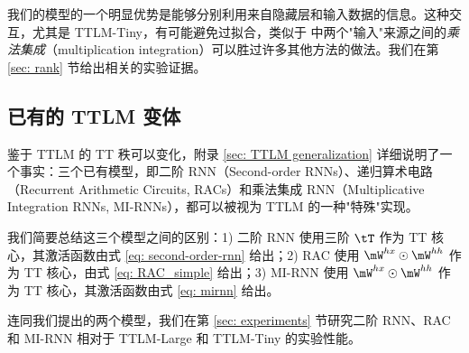 我们的模型的一个明显优势是能够分别利用来自隐藏层和输入数据的信息。这种交互，尤其是 TTLM-Tiny，有可能避免过拟合，类似于 \cite{wu_multiplicative_2016} 中两个"输入"来源之间的\textit{乘法集成}（multiplication integration）可以胜过许多其他方法的做法。我们在第 \ref{sec: rank} 节给出相关的实验证据。



\subsection{已有的 TTLM 变体}
\label{sec: Existing  TTLM variants}
鉴于 TTLM 的 TT 秩可以变化，附录 \ref{sec: TTLM generalization} 详细说明了一个事实：三个已有模型，即二阶 RNN（Second-order RNNs）、递归算术电路（Recurrent Arithmetic Circuits, RACs）和乘法集成 RNN（Multiplicative Integration RNNs, MI-RNNs），都可以被视为 TTLM 的一种"特殊"实现。

我们简要总结这三个模型之间的区别：1) 二阶 RNN 使用三阶 $\tT$ 作为 TT 核心，其激活函数由式 \ref{eq: second-order-rnn} 给出；2)
RAC 使用 $\mW^{hx} \odot \mW^{hh}$ 作为 TT 核心，由式 \ref{eq: RAC_simple} 给出；3) MI-RNN 使用 $\mW^{hx} \odot \mW^{hh}$ 作为 TT 核心，其激活函数由式 \ref{eq: mirnn} 给出。

连同我们提出的两个模型，我们在第 \ref{sec: experiments} 节研究二阶 RNN、RAC 和 MI-RNN 相对于 TTLM-Large 和 TTLM-Tiny 的实验性能。
